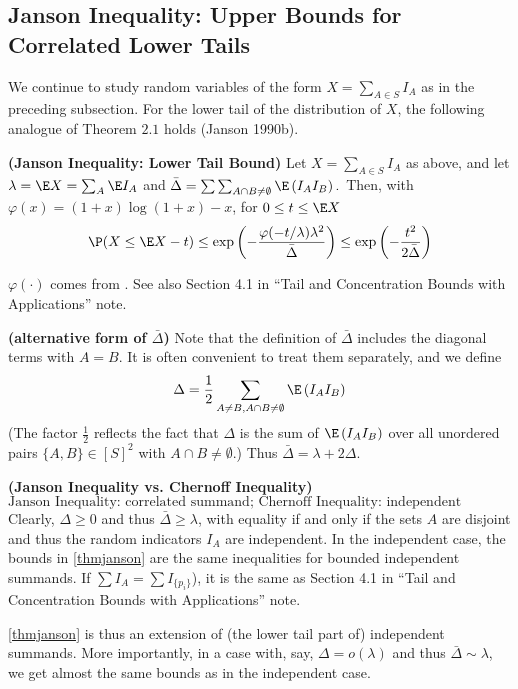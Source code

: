 \documentclass{article}
\newcommand{\bfs}[1]{\textbf{({#1})}}
\begin{document}
\subsection{Janson Inequality: Upper Bounds for Correlated Lower Tails}

We continue to study random variables of the form $X=\sum_{A \in S } I_{A}$ as in the preceding subsection. For the lower tail of the distribution of $X$, the following analogue of Theorem $2.1$ holds (Janson 1990b).

\begin{thma}{\bfs{Janson Inequality: Lower Tail Bound}}\label{thmjanson}
Let $X=\sum_{A \in S} I_{A}$ as above, and let $\lambda= \E X=\sum_{A} \E I_{A}$ and $\bar{\Delta}=\sum \sum_{A \cap B \neq \emptyset} \E \left(I_{A} I_{B}\right) .$ Then, with $\varphi(x)=(1+x) \log (1+x)-x$, for
$0 \leq t \leq \E X$
$$
\P (X \leq \E X-t) \leq \exp \left(-\frac{\varphi(-t / \lambda) \lambda^{2}}{\bar{\Delta}}\right) \leq \exp \left(-\frac{t^{2}}{2 \bar{\Delta}}\right)
$$
\end{thma} 
\begin{rema}
 $\varphi(\cdot)$ comes from  \cite[p.22 Corollary 2.2.]{janson2011random}. See also Section 4.1 in ``Tail and Concentration Bounds with Applications'' note.
\end{rema}
\begin{rema}{\bfs{alternative form of $\bar{\Delta}$}}
Note that the definition of $\bar{\Delta}$ includes the diagonal terms with $A=B .$ It is often convenient to treat them separately, and we define
\begin{align}
    \Delta=\frac{1}{2}  \sum_{A \neq B, A \cap B \neq \emptyset} \E \left(I_{A} I_{B}\right)\label{eq:delta}
\end{align}
(The factor $\frac{1}{2}$ reflects the fact that $\Delta$ is the sum of $\E \left(I_{A} I_{B}\right)$ over all unordered pairs $\{A, B\} \in[ S ]^{2}$ with $A \cap B \neq \emptyset$.) Thus $\bar{\Delta}=\lambda+2 \Delta$.
\end{rema} 

\begin{rema}{\bfs{Janson Inequality vs. Chernoff Inequality}} 
$$\text{Janson Inequality: correlated summand; Chernoff Inequality: independent summand}$$
Clearly, $\Delta \geq 0$ and thus $\bar{\Delta} \geq \lambda$, with equality if and only if the sets $A$ are disjoint and thus the random indicators $I_{A}$ are independent. In the independent case, the bounds in \cref{thmjanson} are the same inequalities for bounded independent summands. If $\sum I_A=\sum I_{\{p_i\}}$), it is the same as Section 4.1 in ``Tail and Concentration Bounds with Applications'' note. 

\cref{thmjanson} is thus an extension of (the lower tail part of) independent summands. More importantly, in a  case with, say, $\Delta=o(\lambda)$ and thus $\bar{\Delta} \sim \lambda$, we get almost the same bounds as in the independent case.
\end{rema} 
\end{document}
